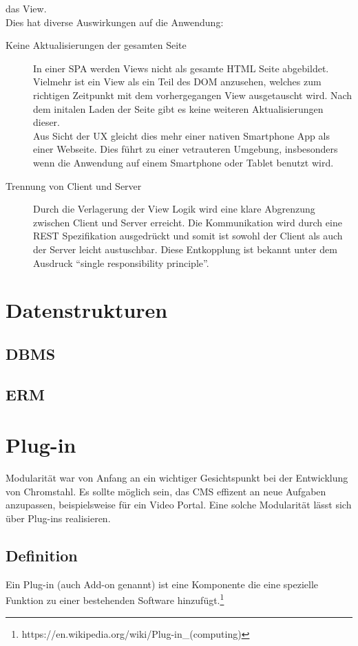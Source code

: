 das View.\\
Dies hat diverse Auswirkungen auf die Anwendung: 
\begin{description}
  \item[Keine Aktualisierungen der gesamten Seite]In einer \ac{SPA} werden Views
    nicht als gesamte \ac{HTML} Seite abgebildet. Vielmehr ist ein View als ein
    Teil des \ac{DOM} anzusehen, welches zum richtigen Zeitpunkt mit dem
    vorhergegangen View ausgetauscht wird. Nach dem initalen Laden der Seite
    gibt es keine weiteren Aktualisierungen dieser.\\
    Aus Sicht der \ac{UX}
    gleicht dies mehr einer nativen Smartphone App als einer Webseite. Dies
    führt zu einer vetrauteren Umgebung, insbesonders wenn die Anwendung auf
    einem Smartphone oder Tablet benutzt wird.
  \item[Trennung von Client und Server]Durch die Verlagerung der
    View Logik wird eine klare Abgrenzung zwischen Client und Server erreicht.
    Die Kommunikation wird durch eine \ac{REST} Spezifikation ausgedrückt und
    somit ist sowohl der Client als auch der Server leicht austuschbar. Diese
    Entkopplung ist bekannt unter dem Ausdruck ``single responsibility principle''\cite{cleancode}.
\end{description}

\section{Datenstrukturen}
\subsection{\acl{DBMS}}
\subsection{\acl{ERM}}
\section{Plug-in}
Modularität war von Anfang an ein wichtiger Gesichtspunkt bei der Entwicklung
von Chromstahl. Es sollte möglich sein, das \ac{CMS} effizent an neue Aufgaben
anzupassen, beispielsweise für ein Video Portal. Eine solche Modularität lässt
sich über Plug-ins realisieren.
\subsection{Definition}
Ein Plug-in (auch Add-on genannt) ist eine Komponente die eine spezielle
Funktion zu einer bestehenden Software
hinzufügt.\footnote{https://en.wikipedia.org/wiki/Plug-in\_(computing)}
